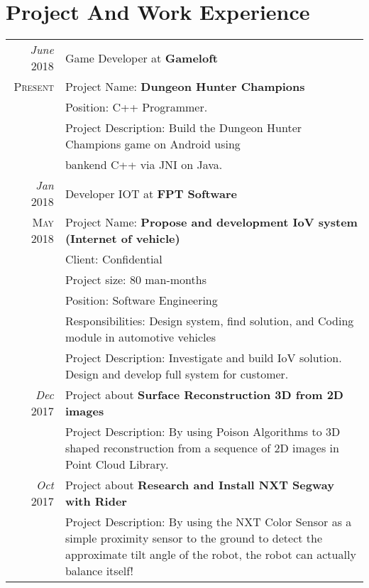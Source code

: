 \documentclass[a4paper,10pt]{article}
\begin{document}
\section{Project And Work Experience}
\begin{tabular}{r|p{14cm}}

\emph{June} 2018 & Game Developer at \textbf{Gameloft}\\
\textsc{Present} & Project Name: \textbf{Dungeon Hunter Champions}\\
& Position: C++ Programmer.\\
& Project Description: Build the Dungeon Hunter Champions game on Android using \\ &bankend C++ via JNI on Java.\multicolumn{2}{c}{} \\
   
   
 \emph{Jan} 2018 & Developer IOT at \textbf{FPT Software} \\\textsc{May 2018}& Project Name: \textbf{Propose and development IoV system (Internet of vehicle)} \\& Client: Confidential\\& Project size: 80 man-months\\& Position: Software Engineering\\& Responsibilities: Design system, find solution, and Coding module in automotive vehicles\\& Project Description: Investigate and build IoV solution. Design and develop full system for customer.\multicolumn{2}{c}{} \\
 


\emph{Dec} 2017 & Project about \textbf{Surface Reconstruction 3D from 2D images} \\& Project Description: By using Poison Algorithms to 3D shaped reconstruction from a sequence of 2D images in Point Cloud Library.  \multicolumn{2}{c}{} \\
   
  \emph{Oct} 2017 & Project about \textbf{Research and Install NXT Segway with Rider} \\& Project Description: By using the NXT Color Sensor as a simple proximity sensor to the ground to detect the approximate tilt angle of the robot, the robot can actually balance itself!  \multicolumn{2}{c}{} \\

\end{tabular}

\end{document}
